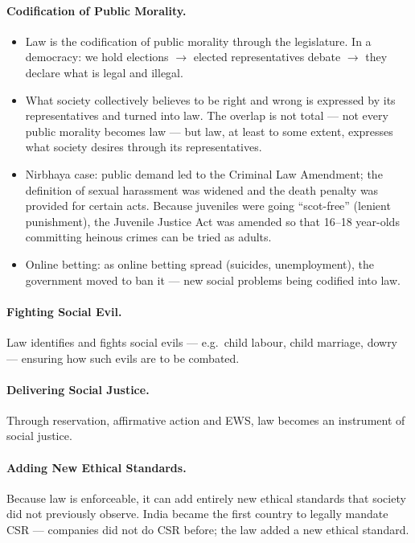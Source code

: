\paragraph{Codification of Public Morality.}
\begin{KeyConcept}
\begin{itemize}
\item Law is the codification of public morality through the legislature. In a democracy: we hold elections $\rightarrow$ elected representatives debate $\rightarrow$ they declare what is legal and illegal.
\item What society collectively believes to be right and wrong is expressed by its representatives and turned into law. The overlap is not total --- not every public morality becomes law --- but law, at least to some extent, expresses what society desires through its representatives.
\end{itemize}
\end{KeyConcept}

\begin{GovtPolicy}
\begin{itemize}
\item Nirbhaya case: public demand led to the Criminal Law Amendment; the definition of sexual harassment was widened and the death penalty was provided for certain acts. Because juveniles were going ``scot-free'' (lenient punishment), the Juvenile Justice Act was amended so that 16--18 year-olds committing heinous crimes can be tried as adults.
\item Online betting: as online betting spread (suicides, unemployment), the government moved to ban it --- new social problems being codified into law.
\end{itemize}
\end{GovtPolicy}

\paragraph{Fighting Social Evil.} Law identifies and fights social evils --- e.g.\ child labour, child marriage, dowry --- ensuring how such evils are to be combated.

\paragraph{Delivering Social Justice.} Through reservation, affirmative action and EWS, law becomes an instrument of social justice.

\paragraph{Adding New Ethical Standards.}
\begin{DataFact}
Because law is enforceable, it can add entirely new ethical standards that society did not previously observe. India became the first country to legally mandate CSR --- companies did not do CSR before; the law added a new ethical standard.
\end{DataFact}

